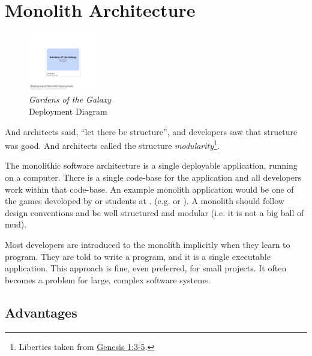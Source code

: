 \section{Monolith Architecture}
\begin{figure}
  \vspace{-5mm}
  \centering
  \includegraphics[trim={230 195 230 198},clip,width=0.27\textwidth]{images/monolith_deployed.png}
  \caption{\centering\emph{Gardens of the Galaxy}\\Deployment Diagram}
\end{figure}

\noindent
And architects said, ``let there be structure'', and developers saw that structure was good.
And architects called the structure \emph{modularity}\footnote{Liberties taken from
\href{https://www.biblegateway.com/passage/?search=gen+1\&version=ESV}{Genesis 1:3-5}.}.

The monolithic software architecture is a single deployable application, running on a computer.
There is a single code-base for the application and all developers work within that code-base.
An example monolith application would be one of the games developed by 
or 
students at .
(e.g. 
or ).
A monolith should follow design conventions and be well structured and modular
(i.e. it is not a big ball of mud).

Most developers are introduced to the monolith implicitly when they learn to program.
They are told to write a program, and it is a single executable application.
This approach is fine, even preferred, for small projects.
It often becomes a problem for large, complex software systems.

\subsection{Advantages}


